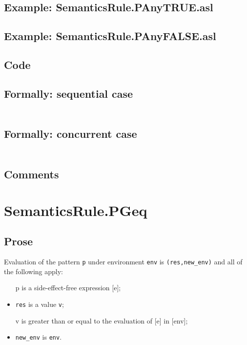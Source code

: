 \documentclass{book}
\begin{document}
    \subsection{Example: SemanticsRule.PAnyTRUE.asl}

    \subsection{Example: SemanticsRule.PAnyFALSE.asl}

    \subsection{Code}

    \subsection{Formally: sequential case}
    \begin{align}
    \end{align} 

    \subsection{Formally: concurrent case}
    \begin{align}
    \end{align} 

    \subsection{Comments}

\section{SemanticsRule.PGeq \label{sec:SemanticsRule.PGeq}}

    \subsection{Prose}
   Evaluation of the pattern \texttt{p} under environment \texttt{env} is
  \texttt{(res,new\_env)} and all of the following apply:
    \begin{itemize}
    \item [p] is a side-effect-free expression [e];
    \item \texttt{res} is a value \texttt{v};
    \item [v] is greater than or equal to the evaluation of [e] in [env];
    \item \texttt{new\_env} is \texttt{env}.
    \end{itemize}
\end{document}
